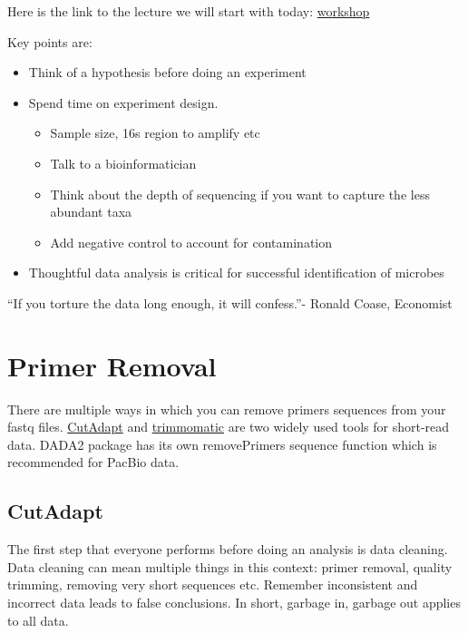 \documentclass[
]{book}
\providecommand{\tightlist}{%
  \setlength{\itemsep}{0pt}\setlength{\parskip}{0pt}}
\begin{document}
Here is the link to the lecture we will start with today: \href{microbiomeworkshop.pdf}{workshop}

Key points are:

\begin{itemize}
\tightlist
\item
  Think of a hypothesis before doing an experiment
\item
  Spend time on experiment design.

  \begin{itemize}
  \tightlist
  \item
    Sample size, 16s region to amplify etc
  \item
    Talk to a bioinformatician
  \item
    Think about the depth of sequencing if you want to capture the less abundant taxa
  \item
    Add negative control to account for contamination
  \end{itemize}
\item
  Thoughtful data analysis is critical for successful identification of microbes
\end{itemize}

``If you torture the data long enough, it will confess.''- Ronald Coase, Economist

\hypertarget{primer-removal}{%
\chapter{Primer Removal}\label{primer-removal}}

There are multiple ways in which you can remove primers sequences from your fastq files.
\href{https://cutadapt.readthedocs.io/en/stable/index.html}{CutAdapt} and \href{http://www.usadellab.org/cms/?page=trimmomatic}{trimmomatic} are two widely used tools for short-read data. DADA2 package has its own removePrimers sequence function which is recommended for PacBio data.

\hypertarget{cutadapt}{%
\section{CutAdapt}\label{cutadapt}}

The first step that everyone performs before doing an analysis is data cleaning. Data cleaning can mean multiple things in this context: primer removal, quality trimming, removing very short sequences etc. Remember inconsistent and incorrect data leads to false conclusions. In short, garbage in, garbage out applies to all data.
\end{document}
